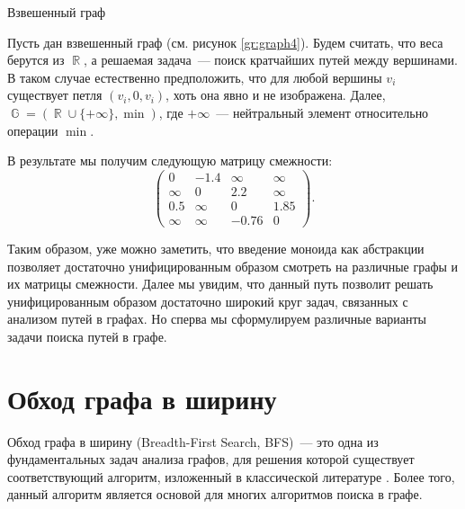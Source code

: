 \begin{marginfigure}
    \begin{center}
        \resizebox{\marginparwidth}{!}{}
    \end{center}
    \caption{Взвешенный граф}
    \label{gr:graph4}
\end{marginfigure}
\begin{example}
    \label{example:apspGraph}
    Пусть дан взвешенный граф (см. рисунок \ref{gr:graph4}).
    Будем считать, что веса берутся из $\BbbR$, а решаемая задача~--- поиск кратчайших путей между вершинами.
    В таком случае естественно предположить, что для любой вершины $v_i$ существует петля $(v_i, 0, v_i)$, хоть она явно и не изображена.
    Далее, $\BbbG = (\BbbR \cup \{+\infty\}, \min)$, где $+\infty$~--- нейтральный элемент относительно операции $\min$.

    В результате мы получим следующую матрицу смежности:
    \[
        \begin{pmatrix}
            0      & -1.4   & \infty & \infty \\
            \infty & 0      & 2.2    & \infty \\
            0.5    & \infty & 0      & 1.85   \\
            \infty & \infty & -0.76  & 0
        \end{pmatrix}.
    \]
\end{example}

Таким образом, уже можно заметить, что введение моноида как абстракции позволяет достаточно унифицированным образом смотреть на различные графы и их матрицы смежности.
Далее мы увидим, что данный путь позволит решать унифицированным образом достаточно широкий круг задач, связанных с анализом путей в графах.
Но сперва мы сформулируем различные варианты задачи поиска путей в графе.

\section{Обход графа в ширину}

Обход графа в ширину (Breadth-First Search, BFS)~--- это одна из фундаментальных задач анализа графов, для решения которой существует соответствующий алгоритм, изложенный в классической литературе
.
Более того, данный алгоритм является основой для многих алгоритмов поиска в графе.

